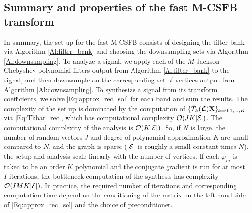 \documentclass[journal, 10pt]{IEEEtran}
\begin{document}



\subsection{Summary and properties of the fast M-CSFB transform} \label{Se:fast_prop}
In summary, the set up for the fast M-CSFB consists of designing the filter bank via Algorithm \ref{Al:filter_bank} and choosing the downsampling sets via Algorithm \ref{Al:downsampling}. To analyze a signal, we apply each of the $M$ Jackson-Chebyshev polynomial filters output from Algorithm \ref{Al:filter_bank} to the signal, and then downsample on the corresponding set of vertices output from Algorithm \ref{Al:downsampling}. To synthesize a signal from its transform coefficients, we solve \eqref{Eq:approx_rec_sol} for each band and sum the results. The complexity of the set up is dominated by the computation of $\{\bar{T}_k(\boldsymbol{\mathcal{L}}){\bf X}\}_{k=0,1,\ldots,K}$  via \eqref{Eq:Tkbar_rec}, which has computational complexity ${\cal O}(JK|\E|)$. The computational complexity of the analysis is ${\cal O}(K|\E|)$. So, if $N$ is large, the number of random vectors $J$ and degree of polynomial approximation $K$ are small compared to $N$, and the graph is sparse ($|{\mathcal{E}}|$ is roughly a small constant times $N$), the setup and analysis scale linearly with the number of vertices. If each $\varphi_m$ is taken to be an order $K$ polynomial and the conjugate gradient is run for at most $I$ iterations, the bottleneck computation of the synthesis has complexity ${\cal O}(IMK|\E|)$. In practice, the required number of iterations and corresponding computation time depend on the conditioning of the matrix on the left-hand side of \eqref{Eq:approx_rec_sol} and the choice of preconditioner. %
\end{document}
